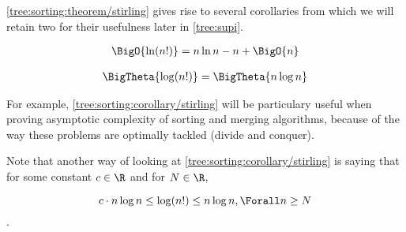 \ref{tree:sorting:theorem/stirling} gives rise to several corollaries from
which we will retain two for their usefulness later in \ref{tree:supi}.



\begin{corollary}
\begin{align*}
\BigO{\ln(n!)} &= n \ln n - n + \BigO{n}\\
\end{align*}
\end{corollary}



\begin{corollary}
\label{tree:sorting:corollary/stirling}
\begin{align*}
\BigTheta{\log(n!)} &= \BigTheta{n \log n}\\
\end{align*}
\end{corollary}


For example, \ref{tree:sorting:corollary/stirling} will be particulary useful
when proving asymptotic complexity of sorting and merging algorithms, because
of the way these problems are optimally tackled (divide and conquer).

Note that another way of looking at \ref{tree:sorting:corollary/stirling} is
saying that for some constant $c \in \R$ and for $N \in \R$,


$$c \cdot n \log n \leq \log(n!) \leq n \log n, \Forall n \geq N$$.
